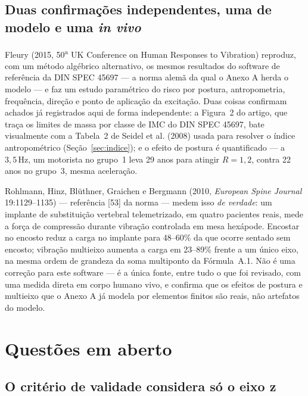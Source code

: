 \documentclass[11pt,a4paper]{article}
\newcommand{\unit}[2]{\ensuremath{#1\,\mathrm{#2}}}
\begin{document}
\subsection{Duas confirmações independentes, uma de modelo e uma \emph{in vivo}}

Fleury (2015, 50\textsuperscript{a} UK Conference on Human Responses to
Vibration) reproduz, com um método algébrico alternativo, os mesmos resultados
do software de referência da DIN SPEC 45697 --- a norma alemã da qual o
Anexo A herda o modelo --- e faz um estudo paramétrico do risco por postura,
antropometria, frequência, direção e ponto de aplicação da excitação. Duas
coisas confirmam achados já registrados aqui de forma independente: a Figura~2
do artigo, que traça os limites de massa por classe de IMC do DIN SPEC 45697,
bate visualmente com a Tabela~2 de Seidel et al. (2008) usada para resolver o
índice antropométrico (Seção~\ref{sec:indice}); e o efeito de postura é
quantificado --- a \unit{3{,}5}{Hz}, um motorista no grupo~1 leva 29 anos para
atingir $R=1{,}2$, contra 22 anos no grupo~3, mesma aceleração.

Rohlmann, Hinz, Blüthner, Graichen e Bergmann (2010, \emph{European Spine
Journal} 19:1129--1135) --- referência [53] da norma --- medem isso
\emph{de verdade}: um implante de substituição vertebral telemetrizado, em
quatro pacientes reais, mede a força de compressão durante vibração controlada
em mesa hexápode. Encostar no encosto reduz a carga no implante para 48--60\%
da que ocorre sentado sem encosto; vibração multieixo aumenta a carga em
23--89\% frente a um único eixo, na mesma ordem de grandeza da soma multiponto
da Fórmula~A.1. Não é uma correção para este software --- é a única fonte,
entre tudo o que foi revisado, com uma medida direta em corpo humano vivo, e
confirma que os efeitos de postura e multieixo que o Anexo A já modela por
elementos finitos são reais, não artefatos do modelo.

\section{Questões em aberto}
\label{sec:limitacoes}

\subsection{O critério de validade considera só o eixo z}
\label{sec:zonly}
\end{document}

